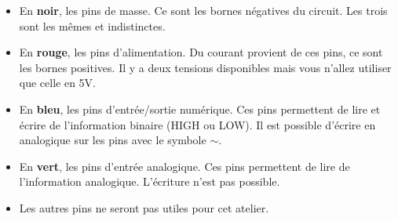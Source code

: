 
\begin{itemize}
	\item En \textbf{noir}, les pins de masse.
		  Ce sont les bornes négatives du circuit.
		  Les trois sont les mêmes et indistinctes.
	\item En \textbf{rouge}, les pins d'alimentation.
		  Du courant provient de ces pins, ce sont les bornes positives.
		  Il y a deux tensions disponibles mais vous n'allez utiliser que celle en 5V.
	\item En \textbf{bleu}, les pins d'entrée/sortie numérique.
		  Ces pins permettent de lire et écrire de l'information binaire (HIGH ou LOW).
		  Il est possible d'écrire en analogique sur les pins avec le symbole \boldmath$\sim$.
	\item En \textbf{vert}, les pins d'entrée analogique.
		  Ces pins permettent de lire de l'information analogique.
		  L'écriture n'est pas possible.
	\item Les autres pins ne seront pas utiles pour cet atelier.
\end{itemize}